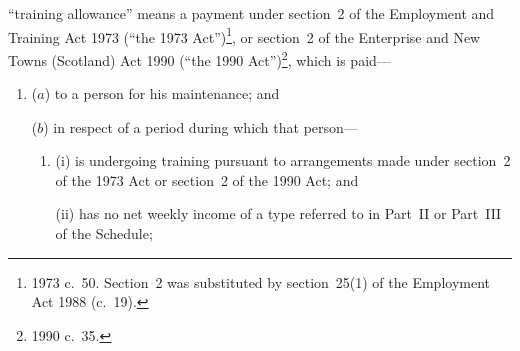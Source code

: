 \documentclass[12pt,a4paper]{article}
\begin{document}
\begin{enumerate}
“training allowance” means a payment under section~2 of the Employment and Training Act 1973 (“the 1973 Act”)\footnote{1973 c.\ 50. Section~2 was substituted by section~25(1) of the Employment Act 1988 (c.\ 19).}, or section~2 of the Enterprise and New Towns (Scotland) Act 1990 (“the 1990 Act”)\footnote{1990 c.\ 35.}, which is paid—
\begin{enumerate}\item[]
($a$) 
to a person for his maintenance; and

($b$) 
in respect of a period during which that person—
\begin{enumerate}\item[]
(i) 
is undergoing training pursuant to arrangements made under section~2 of the 1973 Act or section~2 of the 1990 Act; and

(ii) 
has no net weekly income of a type referred to in Part~II or Part~III of the Schedule;
\end{enumerate}
\end{enumerate}


\end{enumerate}
\end{document}
